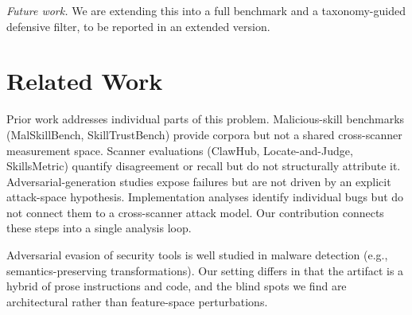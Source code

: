 \documentclass[sigconf,nonacm]{acmart}
\begin{document}
\emph{Future work.} We are extending this into a full benchmark and a taxonomy-guided defensive filter, to be reported in an extended version.

\section{Related Work}
\label{sec:related}

Prior work addresses individual parts of this problem. Malicious-skill benchmarks (MalSkillBench, SkillTrustBench) provide corpora but not a shared cross-scanner measurement space. Scanner evaluations (ClawHub, Locate-and-Judge, SkillsMetric) quantify disagreement or recall but do not structurally attribute it. Adversarial-generation studies expose failures but are not driven by an explicit attack-space hypothesis. Implementation analyses identify individual bugs but do not connect them to a cross-scanner attack model. Our contribution connects these steps into a single analysis loop.

Adversarial evasion of security tools is well studied in malware detection (e.g., semantics-preserving transformations). Our setting differs in that the artifact is a hybrid of prose instructions and code, and the blind spots we find are architectural rather than feature-space perturbations.



\end{document}
